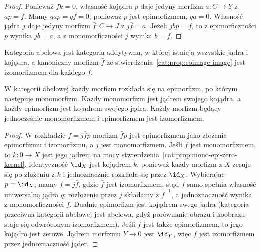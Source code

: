 \begin{proof}
Ponieważ $fk=0$, własność kojądra $p$ daje jedyny morfizm $a:C\to Y$ z $ap=f$. Mamy $qap=qf=0$; ponieważ $p$ jest epimorfizmem, $qa=0$. Własność jądra $j$ daje jedyny morfizm $\bar f:C\to J$ z $j\bar f=a$. Jeżeli $jbp=f$, to z epimorficzności $p$ wynika $jb=a$, a z monomorficzności $j$ wynika $b=\bar f$.
\end{proof}
\begin{center}
\end{center}
\begin{definicja}\label{cat:def:abelian}
Kategoria abelowa jest kategorią addytywną, w której istnieją wszystkie jądra i kojądra, a kanoniczny morfizm $\bar f$ ze stwierdzenia~\ref{cat:prop:coimage-image} jest izomorfizmem dla każdego $f$.
\end{definicja}
\begin{twierdzenie}\label{cat:thm:abelian-factorization}
W kategorii abelowej każdy morfizm rozkłada się na epimorfizm, po którym następuje monomorfizm. Każdy monomorfizm jest jądrem swojego kojądra, a każdy epimorfizm jest kojądrem swojego jądra. Każdy morfizm będący jednocześnie monomorfizmem i epimorfizmem jest izomorfizmem.
\end{twierdzenie}
\begin{proof}
W rozkładzie $f=j\bar f p$ morfizm $\bar f p$ jest epimorfizmem jako złożenie epimorfizmu i izomorfizmu, a $j$ jest monomorfizmem.
Jeśli $f$ jest monomorfizmem, to $k:0\to X$ jest jego jądrem na mocy stwierdzenia~\ref{cat:prop:mono-epi-zero-kernel}. Identyczność $\id_X$ jest kojądrem $k$, ponieważ każdy morfizm z $X$ zeruje się po złożeniu z $k$ i jednoznacznie rozkłada się przez $\id_X$. Wybierając $p=\id_X$, mamy $f=j\bar f$, gdzie $\bar f$ jest izomorfizmem; stąd $f$ samo spełnia własność uniwersalną jądra $q$: rozłożenie przez $j$ składamy z $\bar f^{-1}$, a jednoznaczność wynika z monomorficzności $f$. Dualnie epimorfizm jest kojądrem swego jądra (kategoria przeciwna kategorii abelowej jest abelowa, gdyż porównanie obrazu i koobrazu staje się odwróconym izomorfizmem).
Jeśli $f$ jest także epimorfizmem, to jego kojądro jest zerowe. Jądrem morfizmu $Y\to0$ jest $\id_Y$, więc $f$ jest izomorfizmem przez jednoznaczność jąder.
\end{proof}
